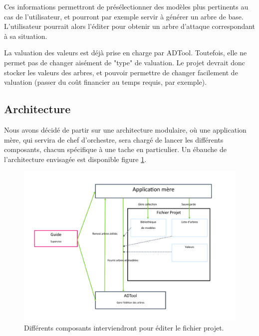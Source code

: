         Ces informations permettront de présélectionner des modèles plus pertinents au cas de l'utilisateur, et pourront par exemple servir à générer un arbre de base. L'utilisateur pourrait alors l'éditer pour obtenir un arbre d'attaque correspondant à sa situation.

        La valuation des valeurs est déjà prise en charge par ADTool. Toutefois, elle ne permet pas de changer aisément de "type" de valuation. Le projet devrait donc stocker les valeurs des arbres, et pouvoir permettre de changer facilement de valuation (passer du coût financier au temps requis, par exemple).
    
    \subsection{Architecture}
        Nous avons décidé de partir sur une architecture modulaire, où une application mère, qui servira de chef d'orchestre, sera chargé de lancer les différents composants, chacun spécifique à une tache en particulier. %
        Un ébauche de l'architecture envisagée est disponible figure \ref{fig:archi}.

        \begin{figure}
            \begin{center}
                \includegraphics[width=1\textwidth]{figure/archi.pdf}
            \end{center}
            \caption{Différents composants interviendront pour éditer le fichier projet.}
            \label{fig:archi}
        \end{figure}

